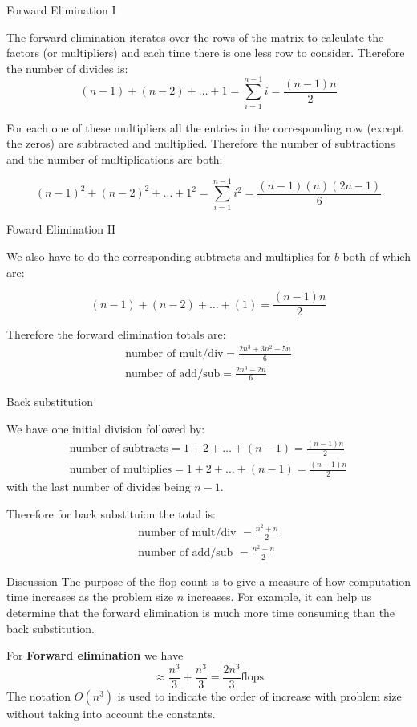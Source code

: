 \documentclass[12pt]{beamer}
\begin{document}
\begin{frame}{Forward Elimination I} 

The forward elimination iterates over the rows of the matrix to
calculate the factors (or multipliers) and each time there is one less
row to consider. Therefore the number of divides is:
\[
(n-1) + (n-2) + \dots + 1 = \sum_{i=1}^{n-1} i = \frac{(n-1)n}{2} 
\]

For each one of these multipliers all the entries in the corresponding
row (except the zeros) are subtracted and multiplied. Therefore 
the number of subtractions and the number of multiplications are both: 

\[
(n-1)^2 + (n-2)^2 + \dots + 1^2 = \sum_{i=1}^{n-1} i^2 = \frac{(n-1)(n)(2n-1)}{6}
\]
\end{frame}

\begin{frame}{Foward Elimination II} 

We also have to do the corresponding subtracts and multiplies for $b$ both of which are: 

\[
(n-1) + (n-2) + \dots + (1) = \frac{(n-1)n}{2}
\]

Therefore the forward elimination totals are: 
\begin{align*} 
\mbox{number of mult/div} = \frac{2n^3 + 3n^2 -5n}{6} \\ 
\mbox{number of add/sub} = \frac{2n^3 - 2n}{6}
\end{align*} 
\end{frame}

\begin{frame}{Back substitution} 

We have one initial division followed by: 
\begin{align*}
 \mbox{number of subtracts} = 1 + 2 + \dots + (n-1) = \frac{(n-1)n}{2} \\ 
\mbox{number of multiplies} = 1 + 2 + \dots + (n-1) = \frac{(n-1)n}{2}
\end{align*} 
\noindent 
with the last number of divides being $n-1$. 

Therefore for back substituion the total is: 
\begin{align*}
\mbox{number of mult/div } = \frac{n^2+n}{2} \\ 
\mbox{number of add/sub } = \frac{n^2-n}{2}
\end{align*}
\end{frame}

\begin{frame}{Discussion} 
The purpose of the flop count is to give a measure of how computation
time increases as the problem size $n$ increases. For example, it can
help us determine that the forward elimination is much more time
consuming than the back substitution. 

For {\bf Forward elimination} we have
\[
\approx \frac{n^3}{3} + \frac{n^3}{3} = \frac{2n^3}{3} \mbox{flops} 
\] 
\noindent 
The notation $O(n^3)$ is used to indicate the order of increase with problem size without taking into account the constants. 

\end{frame}
\end{document}
